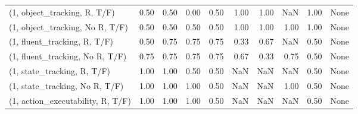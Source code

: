 \begin{table*}[h!]
\begin{adjustbox}{width=2\columnwidth,center}
\begin{tabular}{lrrr|rrr|rrr}
\midrule
(1, object\_tracking, R, T/F)         &                      0.50 &                  0.50 &                      0.00 &                          0.50 &                      1.00 &                          1.00 &                                    NaN &                               1.00 &                                  None \\
(1, object\_tracking, No R, T/F)      &                      0.50 &                  0.50 &                      0.50 &                          0.50 &                      1.00 &                          1.00 &                                   1.00 &                               1.00 &                                  None \\
(1, fluent\_tracking, R, T/F)         &                      0.50 &                  0.75 &                      0.75 &                          0.75 &                      0.33 &                          0.67 &                                    NaN &                               0.50 &                                  None \\
(1, fluent\_tracking, No R, T/F)      &                      0.75 &                  0.75 &                      0.75 &                          0.75 &                      0.67 &                          0.33 &                                   0.75 &                               0.50 &                                  None \\
(1, state\_tracking, R, T/F)          &                      1.00 &                  1.00 &                      0.50 &                          0.50 &                       NaN &                           NaN &                                    NaN &                               0.50 &                                  None \\
(1, state\_tracking, No R, T/F)       &                      1.00 &                  1.00 &                      1.00 &                          0.50 &                       NaN &                           NaN &                                   1.00 &                               0.50 &                                  None \\
(1, action\_executability, R, T/F)    &                      1.00 &                  1.00 &                      1.00 &                          0.50 &                       NaN &                           NaN &                                    NaN &                               0.50 &                                  None \\

\end{tabular}
\end{adjustbox}
\end{table*}
